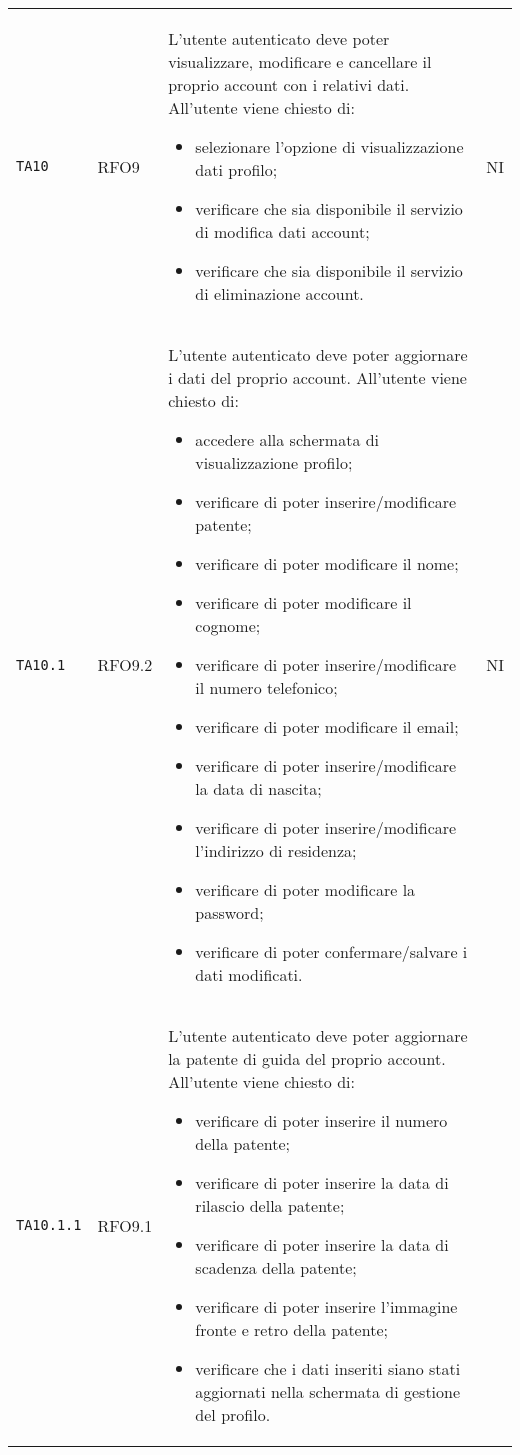 \begin{longtable}{ >{\centering}p{} >{\centering}p{} >{\centering}p{}
			>{\centering}p{}}
		 \texttt{TA10}	& RFO9 & L'utente autenticato deve poter visualizzare, modificare e cancellare il proprio account con i relativi dati. All'utente viene chiesto di:
		 \begin{itemize}
		 	\item selezionare l'opzione di visualizzazione dati profilo;
		 	\item verificare che sia disponibile il servizio di modifica dati account;
		 	\item verificare che sia disponibile il servizio di eliminazione account.
		 \end{itemize}	&	NI	\tabularnewline
		 \texttt{TA10.1} & RFO9.2 & L'utente autenticato deve poter aggiornare i dati del proprio account. All'utente viene chiesto di:
		 \begin{itemize}
		 	\item accedere alla schermata di visualizzazione profilo;
		 	\item verificare di poter inserire/modificare patente;
		 	\item verificare di poter modificare il nome;
		 	\item verificare di poter modificare il cognome;
		 	\item verificare di poter inserire/modificare il numero telefonico;
		 	\item verificare di poter modificare il email;
		 	\item verificare di poter inserire/modificare la data di nascita;
		 	\item verificare di poter inserire/modificare l'indirizzo di residenza;
		 	\item verificare di poter modificare la password;
		 	\item verificare di poter confermare/salvare i dati modificati.
		 \end{itemize}	&	NI	\tabularnewline
		 \texttt{TA10.1.1}	& RFO9.1 & L'utente autenticato deve poter aggiornare la patente di guida del proprio account. All'utente viene chiesto di:
		 \begin{itemize}
		 	\item verificare di poter inserire il numero della patente;
		 	\item verificare di poter inserire la data di rilascio della patente;
		 	\item verificare di poter inserire la data di scadenza della patente;
		 	\item verificare di poter inserire l'immagine fronte e retro della patente;
		 	\item verificare che i dati inseriti siano stati aggiornati nella schermata di gestione del profilo.

\end{itemize}
\end{longtable}
